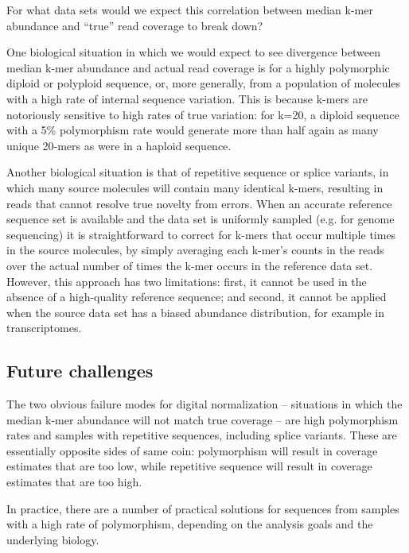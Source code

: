 \documentclass[10pt,draft]{article}
\begin{document}
For what data sets would we expect this correlation between median
k-mer abundance and ``true'' read coverage to break down?

One biological situation in which we would expect to see divergence
between median k-mer abundance and actual read coverage is for a
highly polymorphic diploid or polyploid sequence, or, more generally,
from a population of molecules with a high rate of internal sequence
variation.  This is because k-mers are notoriously sensitive to high
rates of true variation: for k=20, a diploid sequence with a 5\%
polymorphism rate would generate more than half again as many unique
20-mers as were in a haploid sequence.

Another biological situation is that of repetitive sequence or splice
variants, in which many source molecules will contain many identical
k-mers, resulting in reads that cannot resolve true novelty from errors.  When an accurate reference sequence set is available and the
data set is uniformly sampled (e.g. for genome sequencing) it is
straightforward to correct for k-mers that occur multiple times in the
source molecules, by simply averaging each k-mer's counts in the reads
over the actual number of times the k-mer occurs in the reference data
set.  However, this approach has two limitations: first, it cannot be
used in the absence of a high-quality reference sequence; and second,
it cannot be applied when the source data set has a biased abundance
distribution, for example in transcriptomes.


\subsection*{Future challenges}

The two obvious failure modes for digital normalization -- situations
in which the median k-mer abundance will not match true coverage --
are high polymorphism rates and samples with repetitive sequences,
including splice variants.  These are essentially opposite sides of
same coin: polymorphism will result in coverage estimates that are too
low, while repetitive sequence will result in coverage estimates that
are too high.

In practice, there are a number of practical solutions for sequences
from samples with a high rate of polymorphism, depending on the
analysis goals and the underlying biology.
\end{document}
